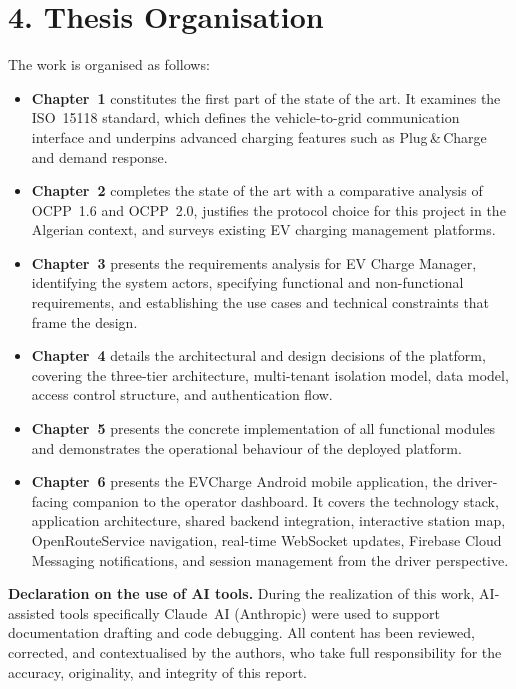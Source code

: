 \documentclass[12pt,a4paper]{report}
\begin{document}
\section*{4. Thesis Organisation}

The work is organised as follows:

\begin{itemize}
  \item \textbf{Chapter~1} constitutes the first part of the state of the art. It examines
        the ISO~15118 standard, which defines the vehicle-to-grid communication interface
        and underpins advanced charging features such as Plug\,\&\,Charge and demand response.

  \item \textbf{Chapter~2} completes the state of the art with a comparative analysis of
        OCPP~1.6 and OCPP~2.0, justifies the protocol choice for this project in the
        Algerian context, and surveys existing EV charging management platforms.

  \item \textbf{Chapter~3} presents the requirements analysis for EV Charge Manager,
        identifying the system actors, specifying functional and non-functional requirements,
        and establishing the use cases and technical constraints that frame the design.

  \item \textbf{Chapter~4} details the architectural and design decisions of the platform,
        covering the three-tier architecture, multi-tenant isolation model, data model,
        access control structure, and authentication flow.

  \item \textbf{Chapter~5} presents the concrete implementation of all functional modules
        and demonstrates the operational behaviour of the deployed platform.

  \item \textbf{Chapter~6} presents the EVCharge Android mobile application, the
        driver-facing companion to the operator dashboard. It covers the technology stack,
        application architecture, shared backend integration, interactive station map,
        OpenRouteService navigation, real-time WebSocket updates, Firebase Cloud Messaging
        notifications, and session management from the driver perspective.
\end{itemize}

\medskip
\noindent\textbf{Declaration on the use of AI tools.} During the realization of this work,
AI-assisted tools  specifically Claude~AI (Anthropic)  were used to support
documentation drafting and code debugging. All content has been reviewed, corrected, and
contextualised by the authors, who take full responsibility for the accuracy, originality,
and integrity of this report.
\end{document}
